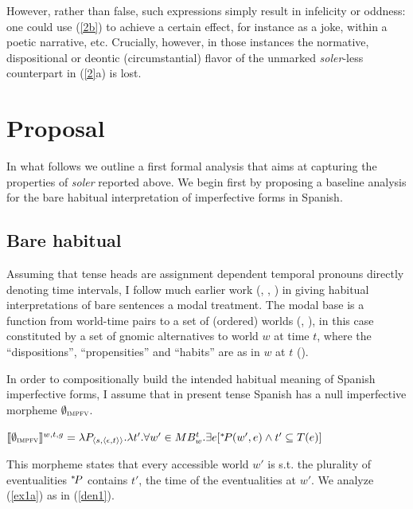 \documentclass{cascadilla-xelatex-biblatex}
\begin{document}
	
	However, rather than false, such expressions simply result in infelicity or oddness: one could use (\ref{2b}) to achieve a certain effect, for instance as a joke, within a poetic narrative, etc. Crucially, however, in those instances the normative, dispositional or deontic (circumstantial) flavor of the unmarked \textit{soler}-less counterpart in (\ref{2}a) is lost. 


	
	\section{Proposal}
	
	In what follows we outline a first formal analysis that aims at capturing the properties of \textit{soler} reported above. We begin first by proposing a baseline analysis for the bare habitual interpretation of imperfective forms in Spanish.
	
	\subsection{Bare habitual}
	
	Assuming that tense heads are assignment dependent temporal pronouns directly denoting time intervals, I follow much earlier work (\cite{Deo:2009}, \cite{ArregiEtAl:2014}, \cite{Ferreira:2016}) in giving habitual interpretations of bare sentences a modal treatment. The modal base is a function from world-time pairs to a set of (ordered) worlds (\cite{Kratzer:1981}, \cite{Kratzer:1991a}), in this case constituted by a set of gnomic alternatives to world $w$ at time $t$, where the ``dispositions'', ``propensities'' and ``habits'' are as in $w$ at $t$ (\cite{Boneh&Doron:2008}). 
	
	In order to compositionally build the intended habitual meaning of Spanish imperfective forms, I assume that in present tense Spanish has a null imperfective morpheme $\emptyset_{\textsc{impfv}}$. 
	
	\ex
	$\llbracket\emptyset_{\textsc{impfv}}\rrbracket^{w,t,g} = \lambda P_{\langle s,\langle \epsilon,t\rangle\rangle}.\lambda t' .\forall w' \in MB_{w}^{t} . \exists e [^{*}\hspace{-.05cm}P(w',e) \wedge t' \subseteq T(e)]$
	\xe
	
	This morpheme states that every accessible world $w'$ is s.t. the plurality of eventualities $^{*}\hspace{-.05cm}P$ contains $t'$, the time of the eventualities at $w'$. We  analyze (\ref{ex1a}) as in (\ref{den1}). 
	
\end{document}
